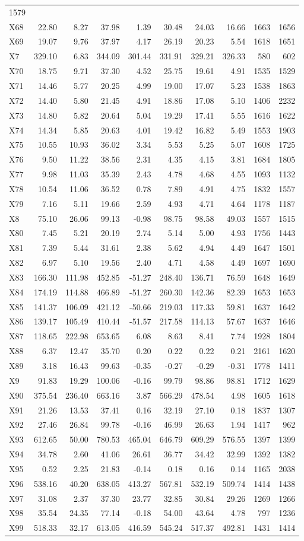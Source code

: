 \documentclass[
]{article}
\begin{document}
\begin{longtable}[]{@{}lrrrrrrrrr@{}}
1579\tabularnewline
X68 & 22.80 & 8.27 & 37.98 & 1.39 & 30.48 & 24.03 & 16.66 & 1663 &
1656\tabularnewline
X69 & 19.07 & 9.76 & 37.97 & 4.17 & 26.19 & 20.23 & 5.54 & 1618 &
1651\tabularnewline
X7 & 329.10 & 6.83 & 344.09 & 301.44 & 331.91 & 329.21 & 326.33 & 580 &
602\tabularnewline
X70 & 18.75 & 9.71 & 37.30 & 4.52 & 25.75 & 19.61 & 4.91 & 1535 &
1529\tabularnewline
X71 & 14.46 & 5.77 & 20.25 & 4.99 & 19.00 & 17.07 & 5.23 & 1538 &
1863\tabularnewline
X72 & 14.40 & 5.80 & 21.45 & 4.91 & 18.86 & 17.08 & 5.10 & 1406 &
2232\tabularnewline
X73 & 14.80 & 5.82 & 20.64 & 5.04 & 19.29 & 17.41 & 5.55 & 1616 &
1622\tabularnewline
X74 & 14.34 & 5.85 & 20.63 & 4.01 & 19.42 & 16.82 & 5.49 & 1553 &
1903\tabularnewline
X75 & 10.55 & 10.93 & 36.02 & 3.34 & 5.53 & 5.25 & 5.07 & 1608 &
1725\tabularnewline
X76 & 9.50 & 11.22 & 38.56 & 2.31 & 4.35 & 4.15 & 3.81 & 1684 &
1805\tabularnewline
X77 & 9.98 & 11.03 & 35.39 & 2.43 & 4.78 & 4.68 & 4.55 & 1093 &
1132\tabularnewline
X78 & 10.54 & 11.06 & 36.52 & 0.78 & 7.89 & 4.91 & 4.75 & 1832 &
1557\tabularnewline
X79 & 7.16 & 5.11 & 19.66 & 2.59 & 4.93 & 4.71 & 4.64 & 1178 &
1187\tabularnewline
X8 & 75.10 & 26.06 & 99.13 & -0.98 & 98.75 & 98.58 & 49.03 & 1557 &
1515\tabularnewline
X80 & 7.45 & 5.21 & 20.19 & 2.74 & 5.14 & 5.00 & 4.93 & 1756 &
1443\tabularnewline
X81 & 7.39 & 5.44 & 31.61 & 2.38 & 5.62 & 4.94 & 4.49 & 1647 &
1501\tabularnewline
X82 & 6.97 & 5.10 & 19.56 & 2.40 & 4.71 & 4.58 & 4.49 & 1697 &
1690\tabularnewline
X83 & 166.30 & 111.98 & 452.85 & -51.27 & 248.40 & 136.71 & 76.59 & 1648
& 1649\tabularnewline
X84 & 174.19 & 114.88 & 466.89 & -51.27 & 260.30 & 142.36 & 82.39 & 1653
& 1653\tabularnewline
X85 & 141.37 & 106.09 & 421.12 & -50.66 & 219.03 & 117.33 & 59.81 & 1637
& 1642\tabularnewline
X86 & 139.17 & 105.49 & 410.44 & -51.57 & 217.58 & 114.13 & 57.67 & 1637
& 1646\tabularnewline
X87 & 118.65 & 222.98 & 653.65 & 6.08 & 8.63 & 8.41 & 7.74 & 1928 &
1804\tabularnewline
X88 & 6.37 & 12.47 & 35.70 & 0.20 & 0.22 & 0.22 & 0.21 & 2161 &
1620\tabularnewline
X89 & 3.18 & 16.43 & 99.63 & -0.35 & -0.27 & -0.29 & -0.31 & 1778 &
1411\tabularnewline
X9 & 91.83 & 19.29 & 100.06 & -0.16 & 99.79 & 98.86 & 98.81 & 1712 &
1629\tabularnewline
X90 & 375.54 & 236.40 & 663.16 & 3.87 & 566.29 & 478.54 & 4.98 & 1605 &
1618\tabularnewline
X91 & 21.26 & 13.53 & 37.41 & 0.16 & 32.19 & 27.10 & 0.18 & 1837 &
1307\tabularnewline
X92 & 27.46 & 26.84 & 99.78 & -0.16 & 46.99 & 26.63 & 1.94 & 1417 &
962\tabularnewline
X93 & 612.65 & 50.00 & 780.53 & 465.04 & 646.79 & 609.29 & 576.55 & 1397
& 1399\tabularnewline
X94 & 34.78 & 2.60 & 41.06 & 26.61 & 36.77 & 34.42 & 32.99 & 1392 &
1382\tabularnewline
X95 & 0.52 & 2.25 & 21.83 & -0.14 & 0.18 & 0.16 & 0.14 & 1165 &
2038\tabularnewline
X96 & 538.16 & 40.20 & 638.05 & 413.27 & 567.81 & 532.19 & 509.74 & 1414
& 1438\tabularnewline
X97 & 31.08 & 2.37 & 37.30 & 23.77 & 32.85 & 30.84 & 29.26 & 1269 &
1266\tabularnewline
X98 & 35.54 & 24.35 & 77.14 & -0.18 & 54.00 & 43.64 & 4.78 & 797 &
1236\tabularnewline
X99 & 518.33 & 32.17 & 613.05 & 416.59 & 545.24 & 517.37 & 492.81 & 1431
& 1414\tabularnewline
\bottomrule
\end{longtable}
\end{document}
